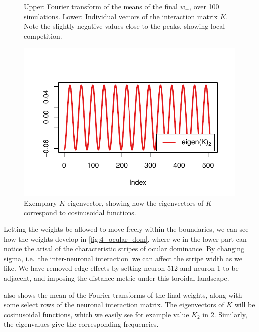 \documentclass[10pt]{article}\usepackage[]{graphicx}\usepackage[]{color}
\makeatletter
\def\maxwidth{ %
  \ifdim\Gin@nat@width>\linewidth
    \linewidth
  \else
    \Gin@nat@width
  \fi
}
\theoremstyle{plain}
\makeatother
\begin{document}
\begin{multicols*}{2}
\begin{Schunk}
\begin{figure}[H]
{}

\caption[Upper]{Upper: Fourier transform of the means of the final $w_-$, over 100 simulations. Lower: Individual vectors of the interaction matrix $K$. Note the slightly negative values close to the peaks, showing local competition.}\label{fig:4_Fourier_k}
\end{figure}
\end{Schunk}


\begin{Schunk}
\begin{figure}[H]

{\centering \includegraphics[width=\maxwidth]{../figures/twocolumn-4_K_cos-1} 

}

\caption[Exemplary $K$ eigenvector, showing how the eigenvectors of $K$ correspond to cosinusoidal functions]{Exemplary $K$ eigenvector, showing how the eigenvectors of $K$ correspond to cosinusoidal functions.}\label{fig:4_K_cos}
\end{figure}
\end{Schunk}
Letting the weights be allowed to move freely within the boundaries, we can see how the weights develop in \cref{fig:4_ocular_dom}, where we in the lower part can notice the arisal of the characteristic stripes of ocular dominance.  By changing sigma, i.e.\ the inter-neuronal interaction, we can affect the stripe width as we like. We have removed edge-effects by setting neuron 512 and neuron 1 to be adjacent, and imposing the distance metric under this toroidal landscape. 

 also shows the mean of the Fourier transforms of the final weights, along with some select rows of the neuronal interaction matrix. The eigenvectors of $K$ will be cosinusoidal functions, which we easily see for example value $K_2$ in \cref{fig:4_K_cos}. Similarly, the eigenvalues give the corresponding frequencies. 



\end{multicols*}
\end{document}
